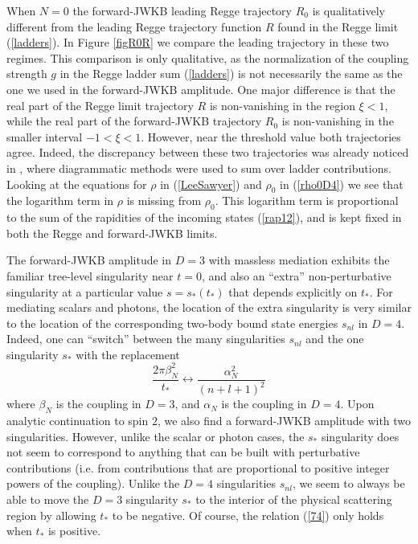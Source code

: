 When $N = 0$ the forward-JWKB leading Regge trajectory $R_{0}$ is qualitatively different from the leading Regge trajectory function $R$ found in the Regge limit (\ref{ladders}). In Figure \ref{figR0R} we compare the leading trajectory in these two regimes. This comparison is only qualitative, as the normalization of the coupling strength $g$ in the Regge ladder sum (\ref{ladders}) is not necessarily the same as the one we used in the forward-JWKB amplitude. One major difference is that the real part of the Regge limit trajectory $R$ is non-vanishing in the region $\xi < 1$, while the real part of the forward-JWKB trajectory $R_{0}$ is non-vanishing in the smaller interval $-1 < \xi < 1$. However, near the threshold value both trajectories agree. Indeed, the discrepancy between these two trajectories was already noticed in \cite{Levy:1970yn}, where diagrammatic methods were used to sum over ladder contributions. Looking at the equations for $\rho$ in (\ref{LeeSawyer}) and $\rho_{0}$ in (\ref{rho0D4}) we see that the logarithm term in $\rho$ is missing from $\rho_{0}$. This logarithm term is proportional to the sum of the rapidities of the incoming states (\ref{rap12}), and is kept fixed in both the Regge and forward-JWKB limits. 

The forward-JWKB amplitude in $D = 3$ with massless mediation exhibits the familiar tree-level singularity near $t = 0$, and also an ``extra'' non-perturbative singularity at a particular value $s = s_{*}(t_{*})$ that depends explicitly on $t_{*}$. For mediating scalars and photons, the location of the extra singularity is very similar to the location of the corresponding two-body bound state energies $s_{nl}$ in $D = 4$. Indeed, one can ``switch'' between the many singularities $s_{nl}$ and the one singularity $s_{*}$ with the replacement
\begin{equation}
	\frac{2 \pi \beta^{2}_{N}}{t_{*}} \longleftrightarrow \frac{\alpha^{2}_{N}}{(n + l + 1)^{2}} \label{74}
\end{equation}
where $\beta_{N}$ is the coupling in $D = 3$, and $\alpha_{N}$ is the coupling in $D = 4$. Upon analytic continuation to spin $2$, we also find a forward-JWKB amplitude with two singularities. However, unlike the scalar or photon cases, the $s_{*}$ singularity does not seem to correspond to anything that can be built with perturbative contributions (i.e. from contributions that are proportional to positive integer powers of the coupling). Unlike the $D = 4$ singularities $s_{nl}$, we seem to always be able to move the $D = 3$ singularity $s_{*}$ to the interior of the physical scattering region by allowing $t_{*}$ to be negative. Of course, the relation (\ref{74}) only holds when $t_{*}$ is positive.

